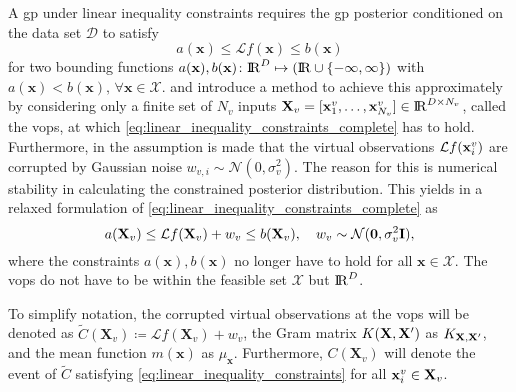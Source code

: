 A \gls{gp} under linear inequality constraints requires the \gls{gp} posterior conditioned on the data set $\mathcal{D}$ to satisfy
\begin{equation}
    a(\mathbf{x}) \leq \mathcal{L} f(\mathbf{x}) \leq b(\mathbf{x})
    \label{eq:linear_inequality_constraints_complete}
\end{equation}
for two bounding functions $a(\mathbf{x}), b(\mathbf{x})\colon \mathrm{I\!R}^D \mapsto (\mathrm{I\!R} \cup \{-\infty, \infty\})$ with $a(\mathbf{x}) < b(\mathbf{x}),\, \forall \mathbf{x} \in \mathcal{X}$. \textcite{Agrell_2019} and \textcite{Wang_2016} introduce a method to achieve this approximately by considering only a finite set of $N_v$ inputs ${\mathbf{X}_v = [\mathrm{\mathbf{x}}^v_{1}, \dots ,\mathrm{\mathbf{x}}^v_{N_v}] \in \mathrm{I\!R}^{D \times N_v}}$, called the \glspl{vop}, at which \eqref{eq:linear_inequality_constraints_complete} has to hold. Furthermore, in \textcite{Agrell_2019} the assumption is made that the virtual observations $\mathcal{L} f(\mathrm{\mathbf{x}}^v_{i})$ are corrupted by Gaussian noise $w_{v,i} \sim \mathcal{N}(0, \sigma_v^2)$. The reason for this is numerical stability in calculating the constrained posterior distribution. This yields in a relaxed formulation of \eqref{eq:linear_inequality_constraints_complete} as
\begin{equation}
    a(\mathbf{X}_v) \leq \mathcal{L} f(\mathbf{X}_v) + w_v \leq b(\mathbf{X}_v), \quad w_{v} \sim \mathcal{N}(\mathbf{0}, \sigma_v^2\mathrm{\mathbf{I}}),
    \label{eq:linear_inequality_constraints}
\end{equation}
where the constraints $a(\mathbf{x}), b(\mathbf{x})$ no longer have to hold for all $\mathbf{x} \in \mathcal{X}$. The \glspl{vop} do not have to be within the feasible set $\mathcal{X}$ but $\mathrm{I\!R}^D$.

To simplify notation, the corrupted virtual observations at the \glspl{vop} will be denoted as ${\tilde{C}(\mathbf{X}_v) \coloneqq \mathcal{L} f(\mathbf{X}_v) + w_v}$, the Gram matrix $K(\mathrm{\mathbf{X}},\mathrm{\mathbf{X}}')$ as $K_{\mathrm{\mathbf{X}},\mathrm{\mathbf{X}}'}$, and the mean function $m(\mathbf{x})$ as $\mu_\mathbf{x}$. Furthermore, $C(\mathbf{X}_v)$ will denote the event of $\tilde{C}$ satisfying \eqref{eq:linear_inequality_constraints} for all $\mathrm{\mathbf{x}}^v_{i} \in \mathbf{X}_v$.

